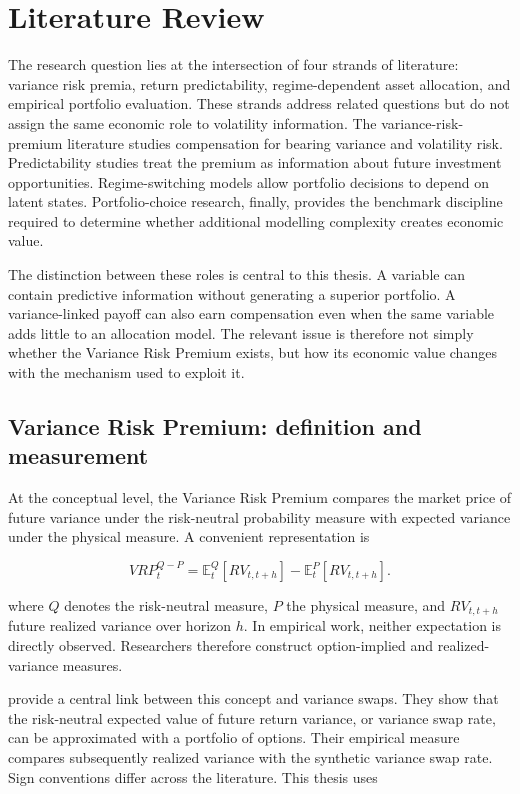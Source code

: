 \section{Literature Review}
\label{sec:literature}

The research question lies at the intersection of four strands of literature: variance risk premia, return predictability, regime-dependent asset allocation, and empirical portfolio evaluation. These strands address related questions but do not assign the same economic role to volatility information. The variance-risk-premium literature studies compensation for bearing variance and volatility risk. Predictability studies treat the premium as information about future investment opportunities. Regime-switching models allow portfolio decisions to depend on latent states. Portfolio-choice research, finally, provides the benchmark discipline required to determine whether additional modelling complexity creates economic value.

The distinction between these roles is central to this thesis. A variable can contain predictive information without generating a superior portfolio. A variance-linked payoff can also earn compensation even when the same variable adds little to an allocation model. The relevant issue is therefore not simply whether the Variance Risk Premium exists, but how its economic value changes with the mechanism used to exploit it.

\subsection{Variance Risk Premium: definition and measurement}

At the conceptual level, the Variance Risk Premium compares the market price of future variance under the risk-neutral probability measure with expected variance under the physical measure. A convenient representation is

\begin{equation}
VRP^{Q-P}_t
=
\mathbb{E}^{Q}_{t}
\left[
RV_{t,t+h}
\right]
-
\mathbb{E}^{P}_{t}
\left[
RV_{t,t+h}
\right].
\end{equation}

where \(Q\) denotes the risk-neutral measure, \(P\) the physical measure, and \(RV_{t,t+h}\) future realized variance over horizon \(h\). In empirical work, neither expectation is directly observed. Researchers therefore construct option-implied and realized-variance measures.

\textcite{CarrWu2009} provide a central link between this concept and variance swaps. They show that the risk-neutral expected value of future return variance, or variance swap rate, can be approximated with a portfolio of options. Their empirical measure compares subsequently realized variance with the synthetic variance swap rate. Sign conventions differ across the literature. This thesis uses

